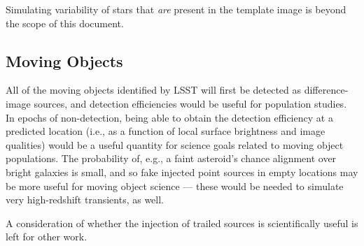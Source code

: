 Simulating variability of stars that {\it are} present in the template image is beyond the scope of this document.


\subsection{Moving Objects}\label{ssec:sci_move}

All of the moving objects identified by LSST will first be detected as difference-image sources, and detection efficiencies would be useful for population studies.
In epochs of non-detection, being able to obtain the detection efficiency at a predicted location (i.e., as a function of local surface brightness and image qualities) would be a useful quantity for science goals related to moving object populations.
The probability of, e.g., a faint asteroid's chance alignment over bright galaxies is small, and so fake injected point sources in empty locations may be more useful for moving object science --- these would be needed to simulate very high-redshift transients, as well.

A consideration of whether the injection of trailed sources is scientifically useful is left for other work.

